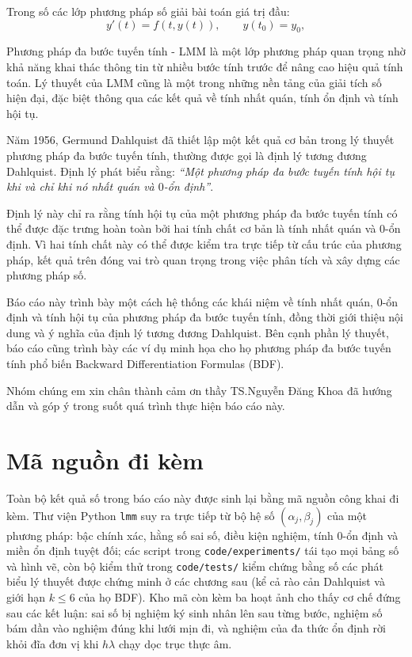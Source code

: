 \documentclass[12pt,a4paper]{article}
\begin{document}
Trong số các lớp phương pháp số giải bài toán giá trị đầu:
\[
    y'(t) = f(t,y(t)), \qquad y(t_0) = y_0,
\]

Phương pháp đa bước tuyến tính - LMM là một lớp phương pháp quan trọng nhờ khả năng khai thác thông tin từ nhiều bước tính trước để nâng cao hiệu quả tính toán. Lý thuyết của LMM cũng là một trong những nền tảng của giải tích số hiện đại, đặc biệt thông qua các kết quả về tính nhất quán, tính ổn định và tính hội tụ.

Năm 1956, Germund Dahlquist đã thiết lập một kết quả cơ bản trong lý thuyết phương pháp đa bước tuyến tính, thường được gọi là định lý tương đương Dahlquist. Định lý phát biểu rằng: \textit{``Một phương pháp đa bước tuyến tính hội tụ khi và chỉ khi nó nhất quán và $0$-ổn định''}.

Định lý này chỉ ra rằng tính hội tụ của một phương pháp đa bước tuyến tính có thể được đặc trưng hoàn toàn bởi hai tính chất cơ bản là tính nhất quán và $0$-ổn định. Vì hai tính chất này có thể được kiểm tra trực tiếp từ cấu trúc của phương pháp, kết quả trên đóng vai trò quan trọng trong việc phân tích và xây dựng các phương pháp số.

Báo cáo này trình bày một cách hệ thống các khái niệm về tính nhất quán, $0$-ổn định và tính hội tụ của phương pháp đa bước tuyến tính, đồng thời giới thiệu nội dung và ý nghĩa của định lý tương đương Dahlquist. Bên cạnh phần lý thuyết, báo cáo cũng trình bày các ví dụ minh họa cho họ phương pháp đa bước tuyến tính phổ biến Backward Differentiation Formulas (BDF).

Nhóm chúng em xin chân thành cảm ơn thầy TS.Nguyễn Đăng Khoa đã hướng dẫn và góp ý trong suốt quá trình thực hiện báo cáo này.

\newpage
\section*{Mã nguồn đi kèm}
Toàn bộ kết quả số trong báo cáo này được sinh lại bằng mã nguồn công khai đi kèm.
Thư viện Python \texttt{lmm} suy ra trực tiếp từ bộ hệ số $(\alpha_j,\beta_j)$ của một
phương pháp: bậc chính xác, hằng số sai số, điều kiện nghiệm, tính 0-ổn định và miền
ổn định tuyệt đối; các script trong \texttt{code/experiments/} tái tạo mọi bảng số và
hình vẽ, còn bộ kiểm thử trong \texttt{code/tests/} kiểm chứng bằng số các phát biểu
lý thuyết được chứng minh ở các chương sau (kể cả rào cản Dahlquist và giới hạn
$k \leq 6$ của họ BDF). Kho mã còn kèm ba hoạt ảnh cho thấy cơ chế đứng sau các kết
luận: sai số bị nghiệm ký sinh nhân lên sau từng bước, nghiệm số bám dần vào nghiệm
đúng khi lưới mịn đi, và nghiệm của đa thức ổn định rời khỏi đĩa đơn vị khi $h\lambda$
chạy dọc trục thực âm.
\end{document}
